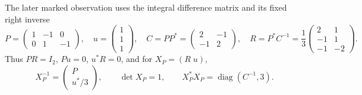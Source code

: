 The later marked observation uses the integral difference matrix and its
fixed right inverse
\begin{equation}
 P=\begin{pmatrix}1&-1&0\\0&1&-1\end{pmatrix},\quad
 u=\begin{pmatrix}1\\1\\1\end{pmatrix},\quad
 C=PP^*=\begin{pmatrix}2&-1\\-1&2\end{pmatrix},\quad
 R=P^*C^{-1}=\frac13
 \begin{pmatrix}2&1\\-1&1\\-1&-2\end{pmatrix}.
 \label{h24:eq:marked-P}
\end{equation}
Thus $PR=I_2$, $Pu=0$, $u^*R=0$, and for $X_P=(R\;u)$,
\begin{equation}
 X_P^{-1}=\begin{pmatrix}P\\u^*/3\end{pmatrix},
 \qquad \det X_P=1,
 \qquad X_P^*X_P=\operatorname{diag}(C^{-1},3).
 \label{h24:eq:marked-inverse}
\end{equation}


